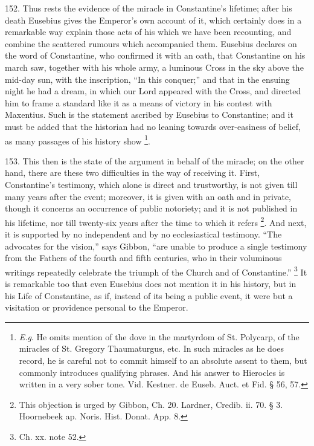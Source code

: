 152.
Thus rests the evidence of the miracle in Constantine's lifetime;
after his death Eusebius gives the Emperor's own account of it, which
certainly does in a remarkable way explain those acts of his
which we have been recounting, and combine the scattered rumours which
accompanied them. Eusebius declares on the word of Constantine, who
confirmed it with an oath, that Constantine on his march saw, together
with his whole army, a luminous Cross in the sky above the mid-day
sun, with the inscription, ``In this conquer;'' and that in the ensuing
night he had a dream, in which our Lord appeared with the Cross, and
directed him to frame a standard like it as a means of victory in his
contest with Maxentius. Such is the statement ascribed by Eusebius to
Constantine; and it must be added that the historian had no leaning
towards over-easiness of belief, as many passages of his history show
\footnote{\emph{E.g}. He omits mention of the dove in the martyrdom of St.
Polycarp, of the miracles of St. Gregory Thaumaturgus, etc. In such
miracles as he does record, he is careful not to commit himself to an
absolute assent to them, but commonly introduces qualifying phrases.
And his answer to Hierocles is written in a very sober tone. Vid.
Kestner. de Euseb. Auct. et Fid. § 56, 57.}.

153.
This then is the state of the argument in behalf of the miracle; on
the other hand, there are these two difficulties in the way of
receiving it. First, Constantine's testimony, which alone is direct
and trustworthy, is not given till many years after the event;
moreover, it is given with an oath and in private, though it concerns
an occurrence of public notoriety; and it is not published in
his lifetime, nor till twenty-six years after the time to which it
refers \footnote{This objection is urged by Gibbon, Ch. 20. Lardner, Credib. ii. 70. §
3. Hoornebeek ap. Noris. Hist. Donat. App. 8.}. And next, it
is supported by no independent and by no ecclesiastical testimony. ``The
advocates for the vision,'' says Gibbon, ``are unable to produce a
single testimony from the Fathers of the fourth and fifth centuries,
who in their voluminous writings repeatedly celebrate the triumph of
the Church and of Constantine.'' \footnote{Ch. xx. note 52.} It is remarkable too that even Eusebius does not mention it in
his history, but in his Life of Constantine, as if, instead of its
being a public event, it were but a visitation or providence personal
to the Emperor.

